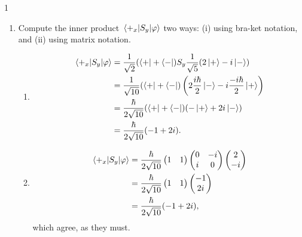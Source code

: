 \documentclass[11pt]{article}
\begin{document}
\begin{problem}{1}
\begin{enumerate}[label=(\alph*)]
\begin{answer}
            \( P_{-_x} \) is calculated identically, or, equivalently, by \( 1 - P_{+_x} = \frac{1}{2} \).
          \end{answer}
    \item Compute the inner product \( \mel{+_x}{S_y}{\varphi} \) two ways: (i) using bra-ket notation, and (ii) using matrix notation.
          \begin{answer}
            \begin{enumerate}[label=(\roman*)]
              \item
                    \begin{equation}
                    \label{eq:12}
                    \begin{aligned}
                      \mel{+_x}{S_y}{\varphi} &= \frac{1}{\sqrt{2}}(\bra{+} + \bra{-}) S_y \frac{1}{\sqrt{5}}(2\ket{+} - i\ket{-}) \\
                                        &= \frac{1}{\sqrt{10}}(\bra{+} + \bra{-})\left( 2 \frac{i\hbar}{2} \ket{-} - i \frac{-i\hbar}{2} \ket{+} \right) \\
                      &= \frac{\hbar}{2\sqrt{10}}(\bra{+} + \bra{-}) ( -\ket{+} + 2i\ket{-} ) \\
                      &= \frac{\hbar}{2\sqrt{10}} (-1 + 2i).
                    \end{aligned}
                    \end{equation}
              \item
                    \begin{equation}
                    \label{eq:13}
                    \begin{aligned}
                      \mel{+_x}{S_y}{\varphi} & =\frac{\hbar}{2\sqrt{10}} \begin{pmatrix}
1  & 1
 \end{pmatrix} \begin{pmatrix}
0  & -i \\
i  & 0
 \end{pmatrix} \begin{pmatrix}
2 \\
-i
 \end{pmatrix} \\
                      &= \frac{\hbar}{2\sqrt{10}} \begin{pmatrix}
1  & 1
 \end{pmatrix} \begin{pmatrix}
-1 \\
2i
 \end{pmatrix} \\
                      &= \frac{\hbar}{2\sqrt{10}} (-1 + 2i),
                    \end{aligned}
                    \end{equation}
                    which agree, as they must.
            \end{enumerate}
          \end{answer}
  \end{enumerate}

\end{problem}
\end{document}
